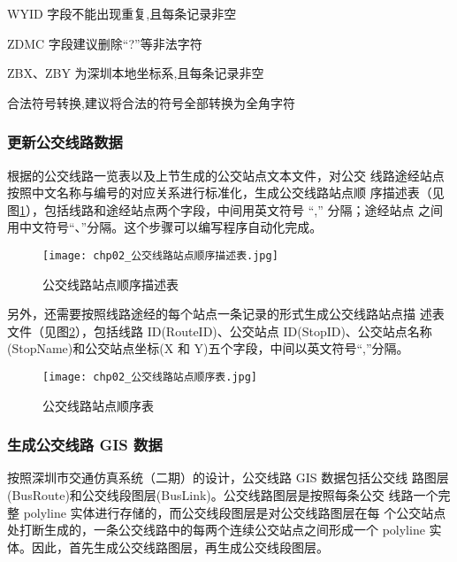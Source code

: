 \begin{cit}
\item WYID 字段不能出现重复,且每条记录非空
\item ZDMC 字段建议删除“?”等非法字符
\item ZBX、ZBY 为深圳本地坐标系,且每条记录非空
\item 合法符号转换,建议将合法的符号全部转换为全角字符
\end{cit}

\subsubsection{更新公交线路数据} \label{subsubsec:更新公交线路数据}
根据的公交线路一览表以及上节生成的公交站点文本文件，对公交
线路途经站点按照中文名称与编号的对应关系进行标准化，生成公交线路站点顺
序描述表（见图\ref{fig:公交线路站点顺序描述表}），包括线路和途经站点两个字段，中间用英文符号 “,” 分隔；途经站点
之间用中文符号“、”分隔。这个步骤可以编写程序自动化完成。

\begin{figure}[!ht]
  \centering
  \texttt{[image: chp02\_公交线路站点顺序描述表.jpg]}
  \caption{公交线路站点顺序描述表\label{fig:公交线路站点顺序描述表} }
\end{figure}

另外，还需要按照线路途经的每个站点一条记录的形式生成公交线路站点描
述表文件（见图\ref{fig:公交线路站点顺序表}），包括线路 ID(RouteID)、公交站点 ID(StopID)、公交站点名称
(StopName)和公交站点坐标(X 和 Y)五个字段，中间以英文符号“,”分隔。

\begin{figure}[!ht]
  \centering
  \texttt{[image: chp02\_公交线路站点顺序表.jpg]}
  \caption{公交线路站点顺序表\label{fig:公交线路站点顺序表} }
\end{figure}

\subsubsection{生成公交线路 GIS 数据}
按照深圳市交通仿真系统（二期）的设计，公交线路 GIS 数据包括公交线
路图层(BusRoute)和公交线段图层(BusLink)。公交线路图层是按照每条公交
线路一个完整 polyline 实体进行存储的，而公交线段图层是对公交线路图层在每
个公交站点处打断生成的，一条公交线路中的每两个连续公交站点之间形成一个
polyline 实体。因此，首先生成公交线路图层，再生成公交线段图层。


